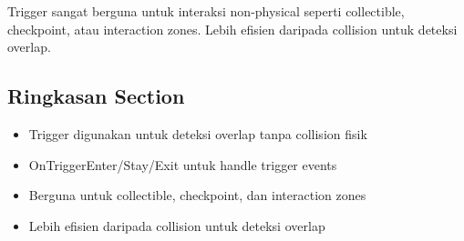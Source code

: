 \begin{catatan}
Trigger sangat berguna untuk interaksi non-physical seperti collectible, checkpoint, atau interaction zones. Lebih efisien daripada collision untuk deteksi overlap.
\end{catatan}

\subsection{Ringkasan Section}

\begin{itemize}
\item Trigger digunakan untuk deteksi overlap tanpa collision fisik
\item OnTriggerEnter/Stay/Exit untuk handle trigger events
\item Berguna untuk collectible, checkpoint, dan interaction zones
\item Lebih efisien daripada collision untuk deteksi overlap
\end{itemize}
